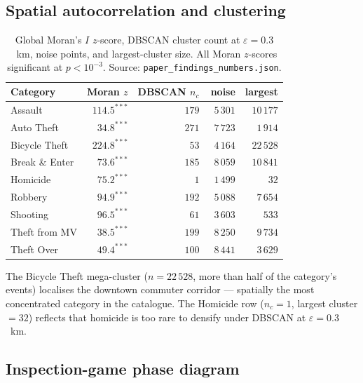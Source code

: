 \documentclass[article,shortnames,nojss]{jss}
\begin{document}
\subsection{Spatial autocorrelation and clustering}\label{phys-spatial}

\begin{table}[h]
\centering\footnotesize
\caption{Global Moran's $I$ $z$-score, DBSCAN cluster count at
$\varepsilon=0.3$~km, noise points, and largest-cluster size.  All
Moran $z$-scores significant at $p<10^{-3}$.  Source:
\texttt{paper\_findings\_numbers.json}.}\label{tab:spatial}
\begin{tabular}{lrrrr}
\toprule
Category & Moran $z$ & DBSCAN $n_c$ & noise & largest\\\midrule
Assault       & $114.5^{\ast\ast\ast}$ & $179$ & $\phantom{0}5\,301$ & $10\,177$\\
Auto Theft    & $\phantom{0}34.8^{\ast\ast\ast}$ & $271$ & $\phantom{0}7\,723$ & $\phantom{0}1\,914$\\
Bicycle Theft & $224.8^{\ast\ast\ast}$ & $\phantom{0}53$ & $\phantom{0}4\,164$ & $22\,528$\\
Break \& Enter& $\phantom{0}73.6^{\ast\ast\ast}$ & $185$ & $\phantom{0}8\,059$ & $10\,841$\\
Homicide      & $\phantom{0}75.2^{\ast\ast\ast}$ & $\phantom{00}1$ & $\phantom{0}1\,499$ & $\phantom{00\,0}32$\\
Robbery       & $\phantom{0}94.9^{\ast\ast\ast}$ & $192$ & $\phantom{0}5\,088$ & $\phantom{0}7\,654$\\
Shooting      & $\phantom{0}96.5^{\ast\ast\ast}$ & $\phantom{0}61$ & $\phantom{0}3\,603$ & $\phantom{0\,0}533$\\
Theft from MV & $\phantom{0}38.5^{\ast\ast\ast}$ & $199$ & $\phantom{0}8\,250$ & $\phantom{0}9\,734$\\
Theft Over    & $\phantom{0}49.4^{\ast\ast\ast}$ & $100$ & $\phantom{0}8\,441$ & $\phantom{0}3\,629$\\
\bottomrule
\end{tabular}
\end{table}

The Bicycle Theft mega-cluster ($n=22\,528$, more than half of the
category's events) localises the downtown commuter corridor —
spatially the most concentrated category in the catalogue.  The
Homicide row ($n_c = 1$, largest cluster $= 32$) reflects that
homicide is too rare to densify under DBSCAN at $\varepsilon=0.3$~km.

\subsection{Inspection-game phase diagram}\label{phys-hsp}
\end{document}
